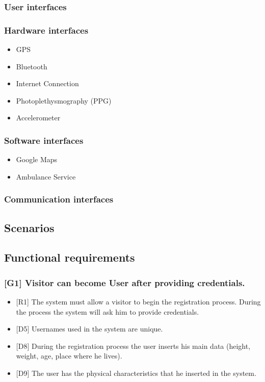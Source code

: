 \documentclass{article}
\begin{document}
\subsubsection{User interfaces}
\subsubsection{Hardware interfaces}
\begin{itemize}
	\item GPS
	\item Bluetooth
	\item Internet Connection
	\item Photoplethysmography (PPG)
	\item Accelerometer
\end{itemize}
\subsubsection{Software interfaces}
\begin{itemize}
	\item Google Maps
	\item Ambulance Service
\end{itemize}
\subsubsection{Communication interfaces}
\subsection{Scenarios}
\subsection{Functional requirements}
\subsubsection{[G1] Visitor can become User after providing credentials.}
\begin{itemize}
\item {[R1]} The system must allow a visitor to begin the registration process. During the process the system will ask him to provide credentials.
\item {[D5]} Usernames used in the system are unique.
\item {[D8]} During the registration process the user inserts his main data (height, weight, age, place where he lives).
\item {[D9]} The user has the physical characteristics that he inserted in the system.
\end{itemize}
\end{document}
